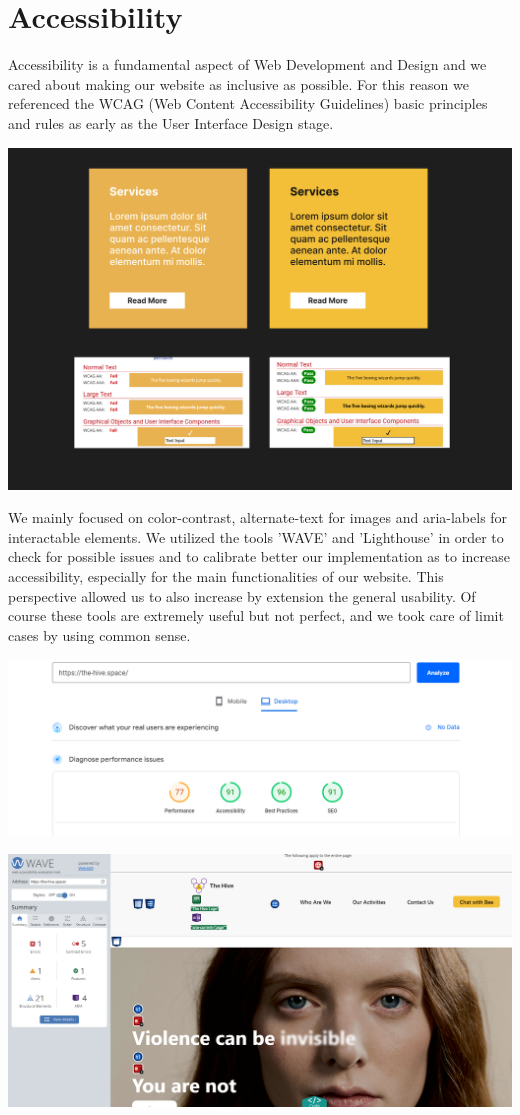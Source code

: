 \section{Accessibility}
Accessibility is a fundamental aspect of Web Development and Design and we cared about making our
website as inclusive as possible. For this reason we referenced the WCAG (Web Content Accessibility Guidelines) basic principles and rules
as early as the User Interface Design stage.

\begin{center}
    \includegraphics[width=0.75\linewidth]{img/color-contrast-check.png}
\end{center}

\vspace{1em}
We mainly focused on color-contrast, alternate-text for images and aria-labels for interactable elements.
We utilized the tools 'WAVE' and 'Lighthouse' in order to check for possible issues and to calibrate better our
implementation as to increase accessibility, especially for the main functionalities of our website.
This perspective allowed us to also increase by extension the general usability.
Of course these tools are extremely useful but not perfect, and we took care of limit cases by using common sense.
\vspace{1em}

\begin{center}
    \includegraphics[width=0.75\linewidth]{img/lighthouse-result.png}
\end{center}

\vspace{1em}

\begin{center}
    \includegraphics[width=0.75\linewidth]{img/wave-result.png}
\end{center}
